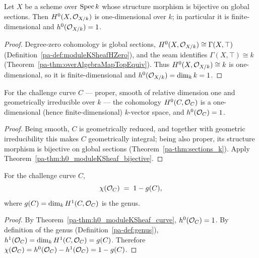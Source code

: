 \begin{theorem}[\(h^0 = 1\) when global sections are constant]
  \label{pa-thm:h0_moduleKSheaf_bijective}
  \leanok

  Let \(X\) be a scheme over \(\operatorname{Spec} k\) whose structure morphism is bijective on global
  sections. Then \(H^0(X, \mathcal{O}_{X/k})\) is one-dimensional over \(k\); in particular it is
  finite-dimensional and \(h^0(\mathcal{O}_{X/k}) = 1\).
\end{theorem}
\begin{proof}
  \leanok
  Degree-zero cohomology is global sections, \(H^0(X, \mathcal{O}_{X/k}) \cong \Gamma(X, \top)\)
  (Definition~\ref{pa-def:moduleKSheafHZero}), and the seam identifies \(\Gamma(X, \top) \cong k\)
  (Theorem~\ref{pa-thm:overAlgebraMapTopEquiv}). Thus \(H^0(X, \mathcal{O}_{X/k}) \cong k\) is
  one-dimensional, so it is finite-dimensional and \(h^0(\mathcal{O}_{X/k}) = \dim_k k = 1\).
\end{proof}

\begin{theorem}
  \label{pa-thm:h0_moduleKSheaf_curve}
  \leanok

  For the challenge curve \(C\) --- proper, smooth of relative dimension one and geometrically
  irreducible over \(k\) --- the cohomology \(H^0(C, \mathcal{O}_{C})\) is a one-dimensional (hence
  finite-dimensional) \(k\)-vector space, and \(h^0(\mathcal{O}_{C}) = 1\).
\end{theorem}
\begin{proof}
  \leanok
  Being smooth, \(C\) is geometrically reduced, and together with geometric irreducibility this
  makes \(C\) geometrically integral; being also proper, its structure morphism is bijective on
  global sections (Theorem~\ref{pa-thm:sections_k}). Apply
  Theorem~\ref{pa-thm:h0_moduleKSheaf_bijective}.
\end{proof}

\begin{theorem}
  \label{pa-thm:chi_moduleKSheaf_curve}
  \leanok

  For the challenge curve \(C\),
  \[
    \chi(\mathcal{O}_{C}) \;=\; 1 - g(C),
  \]
  where \(g(C) = \dim_k H^1(C, \mathcal{O}_{C})\) is the genus.
\end{theorem}
\begin{proof}
  \leanok
  By Theorem~\ref{pa-thm:h0_moduleKSheaf_curve}, \(h^0(\mathcal{O}_{C}) = 1\). By definition of the genus
  (Definition~\ref{pa-def:genus}), \(h^1(\mathcal{O}_{C}) = \dim_k H^1(C, \mathcal{O}_{C}) = g(C)\). Therefore
  \(\chi(\mathcal{O}_{C}) = h^0(\mathcal{O}_{C}) - h^1(\mathcal{O}_{C}) = 1 - g(C)\).
\end{proof}

